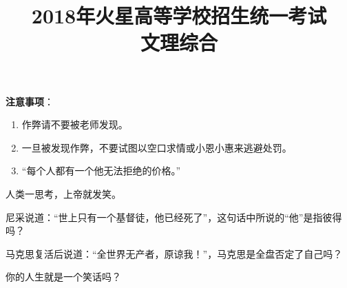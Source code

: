 \documentclass[a3paper, landscape, twocolumn, twoside, zihao = 5,
unicodeGBMath, %
]{ctexart}
\begin{document}
\title{  2018年火星高等学校招生统一考试\\ [-5pt]
   \heiti 文理综合}
\maketitle

{\bfseries \heiti 注意事项}：
\begin{enumerate}
\item 作弊请不要被老师发现。
\item 一旦被发现作弊，不要试图以空口求情或小恩小惠来逃避处罚。
\item “每个人都有一个他无法拒绝的价格。”
\end{enumerate}


\begin{qus}
  
\item 人类一思考，上帝就发笑。\dui
\item 尼采说道：“世上只有一个基督徒，他已经死了”，这句话中所说的“他”是指彼得吗？\cuo
\item 马克思复活后说道：“全世界无产者，原谅我！”，马克思是全盘否定了自己吗？\cuo
\item 你的人生就是一个笑话吗？\dui

\end{qus}

\end{document}
